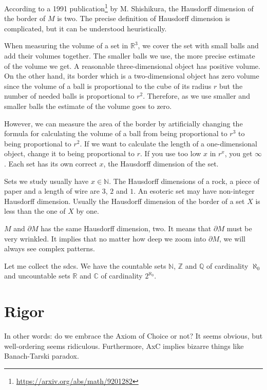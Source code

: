 \documentclass[11pt,%
]{memoir}
\newcommand{\NN}{\mathbb{N}}
\newcommand{\RR}{\mathbb{R}}
\newcommand{\CC}{\mathbb{C}}
\newcommand{\ZZ}{\mathbb{Z}}
\newcommand{\QQ}{\mathbb{Q}}
\begin{document}
According to a 1991 publication\footnote{\url{https://arxiv.org/abs/math/9201282}} by M. Shishikura, the Hausdorff dimension of the border of \(M\) is two. The precise definition of Hausdorff dimension is complicated, but it can be understood heuristically.

When measuring the volume of a set in \(\RR^3\), we cover the set with small balls and add their volumes together. The smaller balls we use, the more precise estimate of the volume we get. A reasonable three-dimensional object has positive volume. On the other hand, its border which is a two-dimensional object has zero volume since the volume of a ball is proportional to the cube of its radius \(r\) but the number of needed balls is proportional to \(r^2\). Therefore, as we use smaller and smaller balls the estimate of the volume goes to zero.

However, we can measure the area of the border by artificially changing the formula for calculating the volume of a ball from being proportional to \(r^3\) to being proportional to \(r^2\). If we want to calculate the length of a one-dimensional object, change it to being proportional to \(r\). If you use too low \(x\) in \(r^x\), you get \(\infty\). Each set has its own correct \(x\), the Hausdorff dimension of the set.

Sets we study usually have \(x\in\NN\). The Hausdorff dimensions of a rock, a piece of paper and a length of wire are \(3\), \(2\) and \(1\). An esoteric set may have non-integer Hausdorff dimension. Usually the Hausdorff dimension of the border of a set \(X\) is less than the one of \(X\) by one.

\(M\) and \(\partial M\) has the same Hausdorff dimension, two. It means that \(\partial M\) must be very wrinkled. It implies that no matter how deep we zoom into \(\partial M\), we will always see complex patterns.%

Let me collect the sdcs. We have the countable sets \(\NN\), \(\ZZ\) and \(\QQ\) of cardinality \(\aleph_0\) and uncountable sets \(\RR\) and \(\CC\) of cardinality \(2^{\aleph_0}\).

\section{Rigor}

 In other words: do we embrace the Axiom of Choice or not? It seems obvious, but well-ordering seems ridiculous. Furthermore, AxC implies bizarre things like Banach-Tarski paradox.
\end{document}
